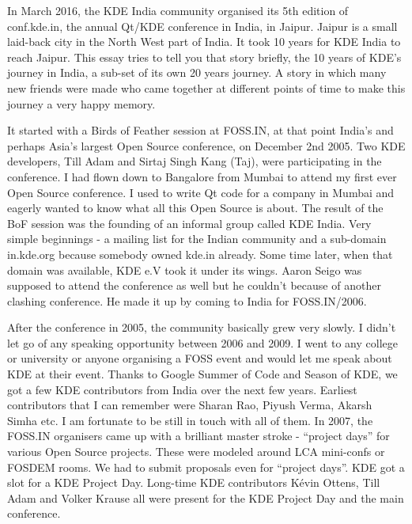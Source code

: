 

\noindent{}In March 2016, the KDE India community organised its 5th edition of conf.kde.in, the annual Qt/KDE conference in India, in Jaipur. Jaipur is a small laid-back city in the North West part of India. It took 10 years for KDE India to reach Jaipur. This essay tries to tell you that story briefly, the 10 years of KDE's journey in India, a sub-set of its own 20 years journey. A story in which many new friends were made who came together at different points of time to make this journey a very happy memory.

It started with a Birds of Feather session at FOSS.IN, at that point India's and perhaps Asia's largest Open Source conference, on December 2nd 2005. Two KDE developers, Till Adam and Sirtaj Singh Kang (Taj), were participating in the conference. I had flown down to Bangalore from Mumbai to attend my first ever Open Source conference. I used to write Qt code for a company in Mumbai and eagerly wanted to know what all this Open Source is about. The result of the BoF session was the founding of an informal group called KDE India. Very simple beginnings - a mailing list for the Indian community and a sub-domain in.kde.org because somebody owned kde.in already. Some time later, when that domain was available, KDE e.V took it under its wings. Aaron Seigo was supposed to attend the conference as well but he couldn't because of another clashing conference. He made it up by coming to India for FOSS.IN/2006.

After the conference in 2005, the community basically grew very slowly. I didn't let go of any speaking opportunity between 2006 and 2009. I went to any college or university or anyone organising a FOSS event and would let me speak about KDE at their event.  Thanks to Google Summer of Code and Season of KDE, we got a few KDE contributors from India over the next few years. Earliest contributors that I can remember were Sharan Rao, Piyush Verma, Akarsh Simha etc. I am fortunate to be still in touch with all of them. In 2007, the FOSS.IN organisers came up with a brilliant master stroke - “project days” for various Open Source projects. These were modeled around LCA mini-confs or FOSDEM rooms. We had to submit proposals even for “project days”. KDE got a slot for a KDE Project Day. Long-time KDE contributors Kévin Ottens, Till Adam and Volker Krause all were present for the KDE Project Day and the main conference.

